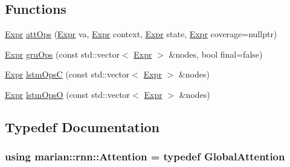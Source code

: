 \subsection*{Functions}
\begin{DoxyCompactItemize}
\item 
\hyperlink{namespacemarian_a498d8baf75b754011078b890b39c8e12}{Expr} \hyperlink{namespacemarian_1_1rnn_a7dd35a8b53e7515e0d3bd91c7be32fe3}{att\+Ops} (\hyperlink{namespacemarian_a498d8baf75b754011078b890b39c8e12}{Expr} va, \hyperlink{namespacemarian_a498d8baf75b754011078b890b39c8e12}{Expr} context, \hyperlink{namespacemarian_a498d8baf75b754011078b890b39c8e12}{Expr} state, \hyperlink{namespacemarian_a498d8baf75b754011078b890b39c8e12}{Expr} coverage=nullptr)
\item 
\hyperlink{namespacemarian_a498d8baf75b754011078b890b39c8e12}{Expr} \hyperlink{namespacemarian_1_1rnn_aebb005fe050e8538752175401598a47a}{gru\+Ops} (const std\+::vector$<$ \hyperlink{namespacemarian_a498d8baf75b754011078b890b39c8e12}{Expr} $>$ \&nodes, bool final=false)
\item 
\hyperlink{namespacemarian_a498d8baf75b754011078b890b39c8e12}{Expr} \hyperlink{namespacemarian_1_1rnn_a0704350093b1deda5d7b5aaef99a9c71}{lstm\+OpsC} (const std\+::vector$<$ \hyperlink{namespacemarian_a498d8baf75b754011078b890b39c8e12}{Expr} $>$ \&nodes)
\item 
\hyperlink{namespacemarian_a498d8baf75b754011078b890b39c8e12}{Expr} \hyperlink{namespacemarian_1_1rnn_a8ab210a35f8c3fa6c4872689ec45295e}{lstm\+OpsO} (const std\+::vector$<$ \hyperlink{namespacemarian_a498d8baf75b754011078b890b39c8e12}{Expr} $>$ \&nodes)
\end{DoxyCompactItemize}


\subsection{Typedef Documentation}
\subsubsection[{\texorpdfstring{Attention}{Attention}}]{\setlength{\rightskip}{0pt plus 5cm}using {\bf marian\+::rnn\+::\+Attention} = typedef {\bf Global\+Attention}}\hypertarget{namespacemarian_1_1rnn_ae9586d2236bd64dae0a644c58d9fc76e}{}\label{namespacemarian_1_1rnn_ae9586d2236bd64dae0a644c58d9fc76e}



